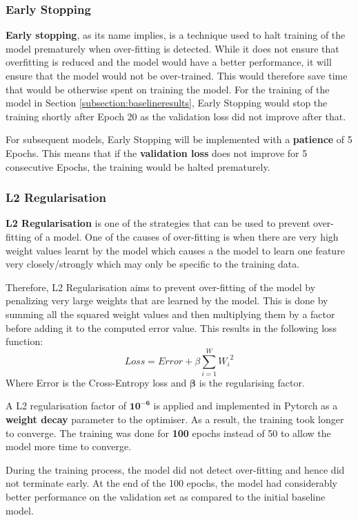 \documentclass[sigconf,nonacm=true]{acmart}
\begin{document}
\subsubsection{Early Stopping}
\textbf{Early stopping}, as its name implies, is a technique used to halt training of the model prematurely when over-fitting is detected. While it does not ensure that overfitting is reduced and the model would have a better performance, it will ensure that the model would not be over-trained. This would therefore save time that would be otherwise spent on training the model. For the training of the model in Section \ref{subsection:baselineresults}, Early Stopping would stop the training shortly after Epoch 20 as the validation loss did not improve after that.

For subsequent models, Early Stopping will be implemented with a \textbf{patience} of 5 Epochs. This means that if the \textbf{validation loss} does not improve for 5 consecutive Epochs, the training would be halted prematurely.

\subsubsection{L2 Regularisation}
\textbf{L2 Regularisation} is one of the strategies that can be used to prevent over-fitting of a model. One of the causes of over-fitting is when there are very high weight values learnt by the model which causes a the model to learn one feature very closely/strongly which may only be specific to the training data. 

Therefore, L2 Regularisation aims to prevent over-fitting of the model by penalizing very large weights that are learned by the model. This is done by summing all the squared weight values and then multiplying them by a factor before adding it to the computed error value. This results in the following loss function:
\begin{equation}\label{key}
Loss = Error + \beta\sum_{i=1}^{W}{W_{i}}^{2}
\end{equation}
Where Error is the Cross-Entropy loss and \(\mathbf{\beta}\) is the regularising factor.

A L2 regularisation factor of \(\mathbf{10^{-6}}\) is applied and implemented in Pytorch as a \textbf{weight decay} parameter to the optimiser. As a result, the training took longer to converge. The training was done for \textbf{100} epochs instead of 50 to allow the model more time to converge. 

During the training process, the model did not detect over-fitting and hence did not terminate early. At the end of the 100 epochs, the model had considerably better performance on the validation set as compared to the initial baseline model.
\end{document}
